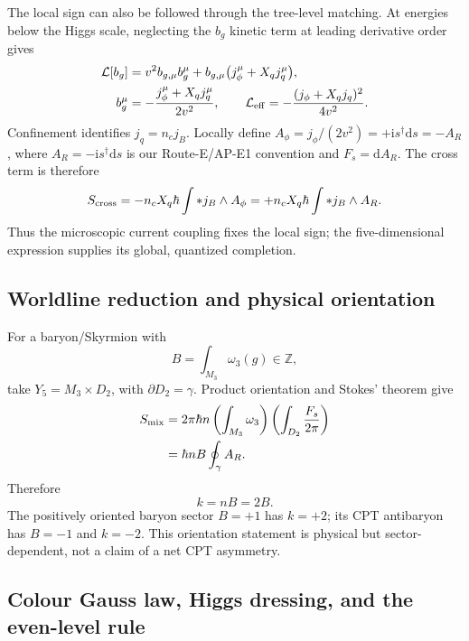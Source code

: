 \documentclass[11pt]{article}
\theoremstyle{definition}
\theoremstyle{remark}
\newcommand{\ii}{\mathrm i}
\newcommand{\dd}{\mathrm d}
\newcommand{\ZZ}{\mathbb Z}
\begin{document}
The local sign can also be followed through the tree-level matching.  At
energies below the Higgs scale, neglecting the \(b_g\) kinetic term at leading
derivative order gives
\begin{align}
 \mathcal L[b_g]
 &=v^2b_{g,\mu}b_g^\mu
 +b_{g,\mu}\bigl(j_\phi^\mu+X_qj_q^\mu\bigr),\notag\\
 b_g^\mu&=-\frac{j_\phi^\mu+X_qj_q^\mu}{2v^2},\qquad
 \mathcal L_{\rm eff}
 =-\frac{(j_\phi+X_qj_q)^2}{4v^2}.
 \label{eq:bg-eom}
\end{align}
Confinement identifies \(j_q=n_cj_B\).  Locally define
\(A_\phi=j_\phi/(2v^2)=+\ii s^\dagger\dd s=-A_R\), where
\(A_R=-\ii s^\dagger\dd s\) is our Route-E/AP-E1 convention and
\(F_s=\dd A_R\).  The cross term is therefore
\begin{equation}
 S_{\rm cross}=-n_cX_q\hbar\int *j_B\wedge A_\phi
 =+n_cX_q\hbar\int *j_B\wedge A_R.
 \label{eq:local-cross}
\end{equation}
Thus the microscopic current coupling fixes the local sign; the
five-dimensional expression supplies its global, quantized completion.

\subsection{Worldline reduction and physical orientation}

For a baryon/Skyrmion with
\begin{equation}
 B=\int_{M_3}\omega_3(g)\in\ZZ,
 \label{eq:baryon-number}
\end{equation}
take \(Y_5=M_3\times D_2\), with \(\partial D_2=\gamma\).  Product
orientation and Stokes' theorem give
\begin{align}
 S_{\rm mix}
 &=2\pi\hbar n
 \left(\int_{M_3}\omega_3\right)
 \left(\int_{D_2}\frac{F_s}{2\pi}\right)\notag\\
 &=\hbar nB\oint_\gamma A_R.
 \label{eq:worldline-reduction}
\end{align}
Therefore
\begin{equation}
 \boxed{k=nB=2B.}
 \label{eq:k-nb}
\end{equation}
The positively oriented baryon sector \(B=+1\) has \(k=+2\); its CPT
antibaryon has \(B=-1\) and \(k=-2\).  This orientation statement is
physical but sector-dependent, not a claim of a net CPT asymmetry.

\subsection{Colour Gauss law, Higgs dressing, and the even-level rule}
\end{document}
